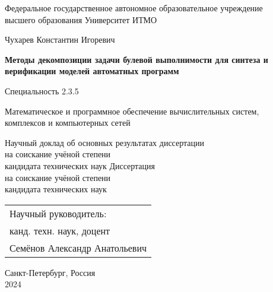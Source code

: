 \thispagestyle{empty}

\begin{center}
    Федеральное государственное автономное образовательное учреждение \\
    высшего образования Университет ИТМО
\end{center}

\vspace{0pt plus2fill}

\begin{center}

{\large
    Чухарев Константин Игоревич
}

\vspace{1cm}

\textbf{\large
Методы декомпозиции задачи булевой выполнимости для синтеза и верификации моделей автоматных программ
}

\vspace{1cm}

Специальность 2.3.5
\begin{SingleSpace*}
    \small
    Математическое и программное обеспечение вычислительных систем, \\
    комплексов и компьютерных сетей
\end{SingleSpace*}

\vspace{1cm}

\ifsynopsis
Научный доклад об основных результатах диссертации \\
на соискание учёной степени \\
кандидата технических наук
\else
Диссертация \\
на соискание учёной степени \\
кандидата технических наук
\fi

\end{center}

\vspace{0pt plus1fill}

\hfill\begin{tabular}{l}
Научный руководитель: \\
канд. техн. наук, доцент \\
Семёнов Александр Анатольевич
\end{tabular}

\vspace{0pt plus1fill}

\begin{center}
    Санкт-Петербург, Россия \\
    2024
\end{center}

